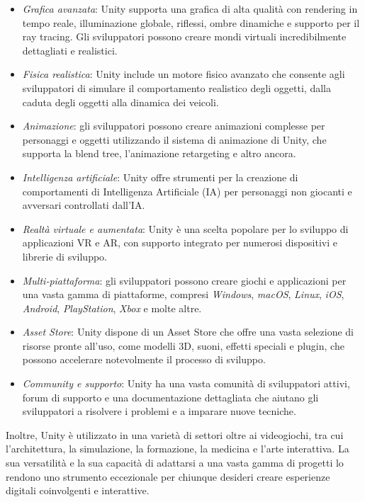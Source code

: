 \begin{itemize}
    \item \textit{Grafica avanzata}: Unity supporta una grafica di alta qualità con rendering in tempo reale, illuminazione globale, riflessi, ombre dinamiche e supporto per il ray tracing. Gli sviluppatori possono creare mondi virtuali incredibilmente dettagliati e realistici.
    \item \textit{Fisica realistica}: Unity include un motore fisico avanzato che consente agli sviluppatori di simulare il comportamento realistico degli oggetti, dalla caduta degli oggetti alla dinamica dei veicoli.
    \item \textit{Animazione}: gli sviluppatori possono creare animazioni complesse per personaggi e oggetti utilizzando il sistema di animazione di Unity, che supporta la blend tree, l'animazione retargeting e altro ancora.
    \item \textit{Intelligenza artificiale}: Unity offre strumenti per la creazione di comportamenti di Intelligenza Artificiale (IA) per personaggi non giocanti e avversari controllati dall'IA.
    \item \textit{Realtà virtuale e aumentata}: Unity è una scelta popolare per lo sviluppo di applicazioni VR e AR, con supporto integrato per numerosi dispositivi e librerie di sviluppo.
    \item \textit{Multi-piattaforma}: gli sviluppatori possono creare giochi e applicazioni per una vasta gamma di piattaforme, compresi \textit{Windows}, \textit{macOS}, \textit{Linux}, \textit{iOS}, \textit{Android}, \textit{PlayStation}, \textit{Xbox} e molte altre.
    \item \textit{Asset Store}: Unity dispone di un Asset Store che offre una vasta selezione di risorse pronte all'uso, come modelli 3D, suoni, effetti speciali e plugin, che possono accelerare notevolmente il processo di sviluppo. 
    \item \textit{Community e supporto}: Unity ha una vasta comunità di sviluppatori attivi, forum di supporto e una documentazione dettagliata che aiutano gli sviluppatori a risolvere i problemi e a imparare nuove tecniche.
\end{itemize}

Inoltre, Unity è utilizzato in una varietà di settori oltre ai videogiochi, tra cui l'architettura, la simulazione, la formazione, la medicina e l'arte interattiva. La sua versatilità e la sua capacità di adattarsi a una vasta gamma di progetti lo rendono uno strumento eccezionale per chiunque desideri creare esperienze digitali coinvolgenti e interattive.

